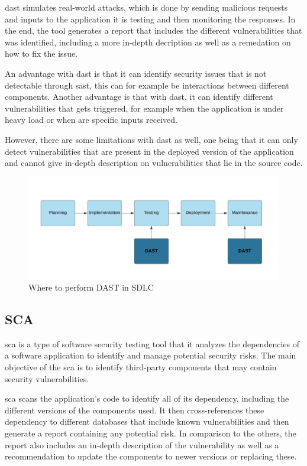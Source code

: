 \acrshort{dast} simulates real-world attacks, which is done by sending malicious requests and inputs to the application it is testing and then monitoring the responses. In the end, the tool generates a report that includes the different vulnerabilities that was identified, including a more in-depth decription as well as a remedation on how to fix the issue. \cite{dast}

An advantage with \acrshort{dast} is that it can identify security issues that is not detectable through \acrshort{sast}, this can for example be interactions between different components. Another advantage is that with \acrshort{dast}, it can identify different vulnerabilities that gets triggered, for example when the application is under heavy load or when are specific inputs received.

However, there are some limitations with \acrshort{dast} as well, one being that it can only detect vulnerabilities that are present in the deployed version of the application and cannot give in-depth description on vulnerabilities that lie in the source code.
\begin{figure}[H]
    \centering
    \includegraphics[width=0.8\columnwidth]{Images/dast.png}
    \caption{Where to perform DAST in SDLC} 
    \label{fig:Where to perform DAST in SDLC}
\end{figure}

\newpage

\subsection{SCA}
\acrlong{sca} is  a type of software security testing tool that it analyzes the dependencies of a software application to identify and manage potential security risks. The main objective of the \acrshort{sca} is to identify third-party components that may contain security vulnerabilities. \cite{sca}

 \acrshort{sca} scans the application's code to identify all of its \gls{dependency}, including the different versions of the components used. It then cross-references these \gls{dependency} to different databases that include known vulnerabilities and then generate a report containing any potential risk. In comparison to the others, the report also includes an in-depth description of the vulnerability as well as a recommendation to update the components to newer versions or replacing these. 

